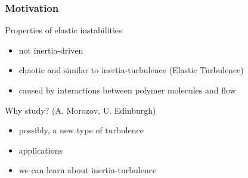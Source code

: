 \begin{frame}
  \frametitle{Motivation}
  \begin{block}{Properties of elastic instabilities}
    \begin{itemize}
    \item not inertia-driven
    \item chaotic and similar to inertia-turbulence (Elastic Turbulence)
    \item caused by interactions between polymer molecules and flow
    \end{itemize}
  \end{block}
  \begin{block}{Why study? (A. Morozov, U. Edinburgh)}
    \begin{itemize}
    \item possibly, a new type of turbulence
    \item applications
    \item we can learn about inertia-turbulence
    \end{itemize}
  \end{block}
\end{frame}


